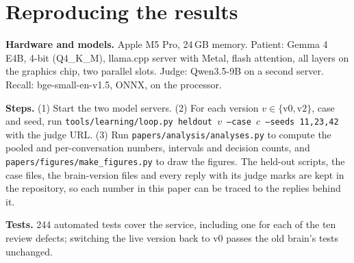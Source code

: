 \documentclass[manuscript, screen, review]{jair}
\begin{document}


\appendix
\section{Reproducing the results}
\textbf{Hardware and models.} Apple M5 Pro, 24\,GB memory. Patient: Gemma 4 E4B, 4-bit (Q4\_K\_M), llama.cpp server with Metal, flash
attention, all layers on the graphics chip, two parallel slots. Judge: Qwen3.5-9B on a second server. Recall: bge-small-en-v1.5, ONNX, on the
processor.

\textbf{Steps.} (1) Start the two model servers. (2) For each version $v\in\{\text{v0},\text{v2}\}$, case and seed, run
\texttt{tools/learning/loop.py heldout $v$ --case $c$ --seeds 11,23,42} with the judge URL. (3) Run \texttt{papers/analysis/analyses.py} to
compute the pooled and per-conversation numbers, intervals and decision counts, and \texttt{papers/figures/make\_figures.py} to draw the
figures. The held-out scripts, the case files, the brain-version files and every reply with its judge marks are kept in the repository, so
each number in this paper can be traced to the replies behind it.

\textbf{Tests.} 244 automated tests cover the service, including one for each of the ten review defects; switching the live version back to v0
passes the old brain's tests unchanged.
\end{document}
